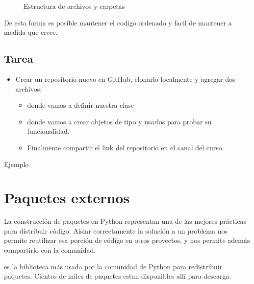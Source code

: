 \documentclass[a5paper,9pt,spanish]{sphinxmanual}
\begin{document}
\begin{figure}[htbp]
\centering
\capstart

\caption{Estructura de archivos y carpetas}\label{\detokenize{my-modules:pkg-structure}}\end{figure}

\sphinxAtStartPar
De esta forma es posible mantener el codigo ordenado y facil de mantener a medida que crece.


\section{Tarea}
\label{\detokenize{my-modules:tarea}}\begin{itemize}
\item {} 
\sphinxAtStartPar
Crear un repositorio nuevo en GitHub, clonarlo localmente y agregar dos archivos:
\begin{itemize}
\item {} 
\sphinxAtStartPar
{} donde vamos a definir nuestra clase 

\item {} 
\sphinxAtStartPar
{} donde vamos a crear objetos de tipo  y usarlos para probar su funcionalidad.

\item {} 
\sphinxAtStartPar
Finalmente compartir el link del repositorio en el canal del curso.

\end{itemize}

\end{itemize}

\sphinxAtStartPar
Ejemplo

\noindent{}

\sphinxstepscope


\chapter{Paquetes externos}
\label{\detokenize{external-packages:paquetes-externos}}\label{\detokenize{external-packages::doc}}
\sphinxAtStartPar
La construcción de paquetes en Python representan una de las mejores prácticas para
distribuir código. Aislar correctamente la solución a un problema nos permite reutilizar
esa porción de código en otros proyectos, y nos permite además compartirlo con la comunidad.
%
\begin{footnote}[32]\sphinxAtStartFootnote
{}
%
\end{footnote} es la biblioteca más usada por la comunidad de Python para
redistribuir paquetes. Cientos de miles de paquetes estan disponibles allí para descarga.
\end{document}
